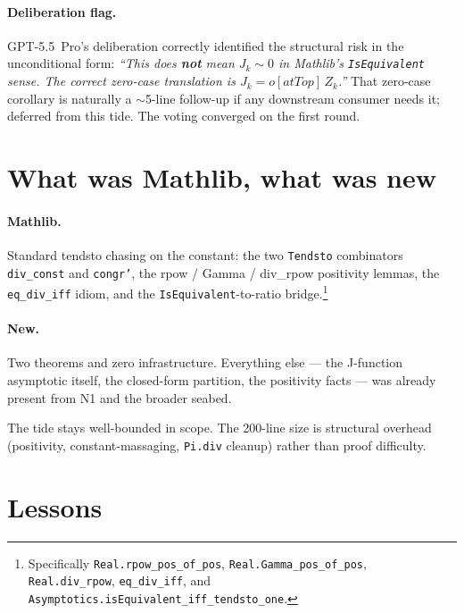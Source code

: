 \documentclass[11pt]{article}
\begin{document}
\paragraph{Deliberation flag.} GPT-5.5~Pro's deliberation correctly
identified the structural risk in the unconditional form: \emph{``This
does \textbf{not} mean $J_k \sim 0$ in Mathlib's \texttt{IsEquivalent}
sense. The correct zero-case translation is $J_k = o[atTop]\,Z_k$.''}
That zero-case corollary is naturally a $\sim$5-line follow-up if any
downstream consumer needs it; deferred from this tide. The voting
converged on the first round.

\section{What was Mathlib, what was new}

\paragraph{Mathlib.} Standard tendsto chasing on the constant: the
two \texttt{Tendsto} combinators \texttt{div\_const} and
\texttt{congr'}, the rpow / Gamma / div\_rpow positivity lemmas, the
\texttt{eq\_div\_iff} idiom, and the \texttt{IsEquivalent}-to-ratio
bridge.\footnote{Specifically
\texttt{Real.rpow\_pos\_of\_pos}, \texttt{Real.Gamma\_pos\_of\_pos},
\texttt{Real.div\_rpow}, \texttt{eq\_div\_iff}, and
\texttt{Asymptotics.isEquivalent\_iff\_tendsto\_one}.}

\paragraph{New.} Two theorems and zero infrastructure. Everything
else --- the J-function asymptotic itself, the closed-form partition,
the positivity facts --- was already present from N1 and the broader
seabed.

The tide stays well-bounded in scope. The 200-line size is structural
overhead (positivity, constant-massaging, \texttt{Pi.div} cleanup) rather
than proof difficulty.

\section{Lessons}
\end{document}
